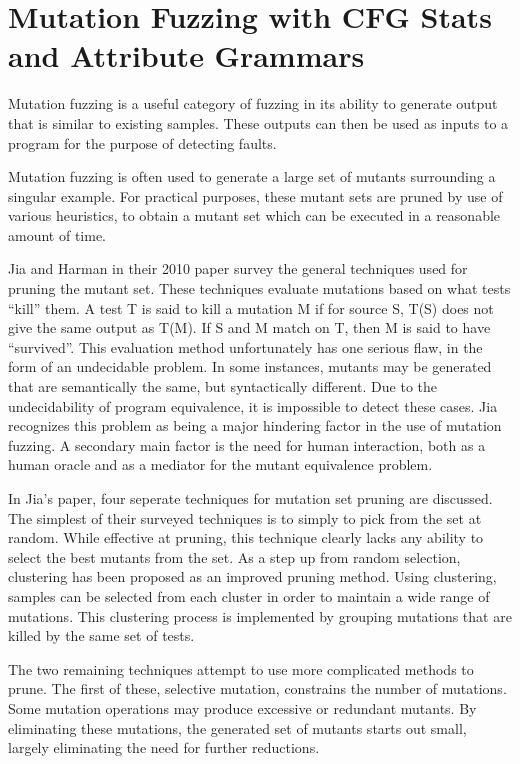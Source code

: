 \section{Mutation Fuzzing with CFG Stats and Attribute Grammars}

Mutation fuzzing is a useful category of fuzzing in its ability to
generate output that is similar to existing samples. These outputs can
then be used as inputs to a program for the purpose of detecting
faults.

Mutation fuzzing is often used to generate a large set of mutants
surrounding a singular example. For practical purposes, these mutant
sets are pruned by use of various heuristics, to obtain a mutant set
which can be executed in a reasonable amount of time.

Jia and Harman in their 2010 paper survey the general techniques used
for pruning the mutant set.\cite{Jia2010} These techniques evaluate
mutations based on what tests ``kill'' them. A test T is said to kill
a mutation M if for source S, T(S) does not give the same output as
T(M). If S and M match on T, then M is said to have ``survived''. This
evaluation method unfortunately has one serious flaw, in the form of
an undecidable problem. In some instances, mutants may be generated
that are semantically the same, but syntactically different. Due to
the undecidability of program equivalence, it is impossible to detect
these cases. Jia recognizes this problem as being a major hindering
factor in the use of mutation fuzzing. A secondary main factor is the
need for human interaction, both as a human oracle and as a mediator
for the mutant equivalence problem.

In Jia's paper, four seperate techniques for mutation set pruning are
discussed. The simplest of their surveyed techniques is to simply to
pick from the set at random. While effective at pruning, this
technique clearly lacks any ability to select the best mutants from
the set. As a step up from random selection, clustering has been
proposed as an improved pruning method. Using clustering, samples can
be selected from each cluster in order to maintain a wide range of
mutations. This clustering process is implemented by grouping
mutations that are killed by the same set of tests.

The two remaining techniques attempt to use more complicated methods
to prune. The first of these, selective mutation, constrains the number
of mutations. Some mutation operations may produce excessive or
redundant mutants. By eliminating these mutations, the generated set
of mutants starts out small, largely eliminating the need for further
reductions.

